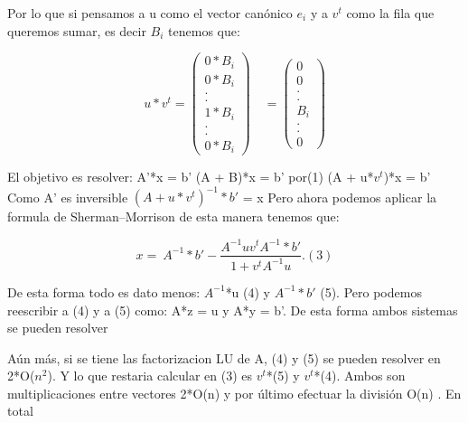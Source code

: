 \documentclass[a4paper]{article}
\begin{document}
Por lo que si pensamos a u como el vector canónico $e_i$ y a $v^t$ como la fila que queremos sumar, es decir $B_i$ tenemos que:


$$
u*v^t=
\begin{pmatrix} 
0*B_i\\
0*B_i\\
.\\
.\\
1*B_i\\
.\\
.\\
0*B_i
\end{pmatrix}
\quad 
=
\begin{pmatrix} 
0\\
0\\
.\\
.\\
B_i\\
.\\
.\\
0
\end{pmatrix}
$$

El objetivo es resolver:\newline
A'*x = b'\newline 
(A + B)*x = b' por(1) \newline
(A + u*$v^t$)*x  = b'\newline
Como A' es inversible
$(A + u*v^t)^{-1}*b'$ = x\newline
Pero ahora podemos aplicar la formula de Sherman–Morrison de esta manera tenemos que: 

\begin{equation}
x =\ A^{-1}*b' - \frac{ A^{-1} u v^t A^{-1}*b'}{1+v^t A^{-1}u}.\label{eq:sm}(3)
\end{equation} 

De esta forma todo es dato menos: $A^{-1}$*u (4) y $A^{-1}*b'$ (5).\newline
Pero podemos reescribir a (4) y a (5) como:\newline
 A*z = u y A*y = b'. De esta forma ambos sistemas se pueden resolver
 
Aún más, si se tiene las factorizacion LU de A, (4) y (5) se pueden resolver en 2*O($n^2$). Y lo que restaria calcular en (3) es $v^t$*(5) y $v^t$*(4). Ambos son multiplicaciones entre vectores 2*O(n) y por último efectuar la división O(n) . En total   
\end{document}
